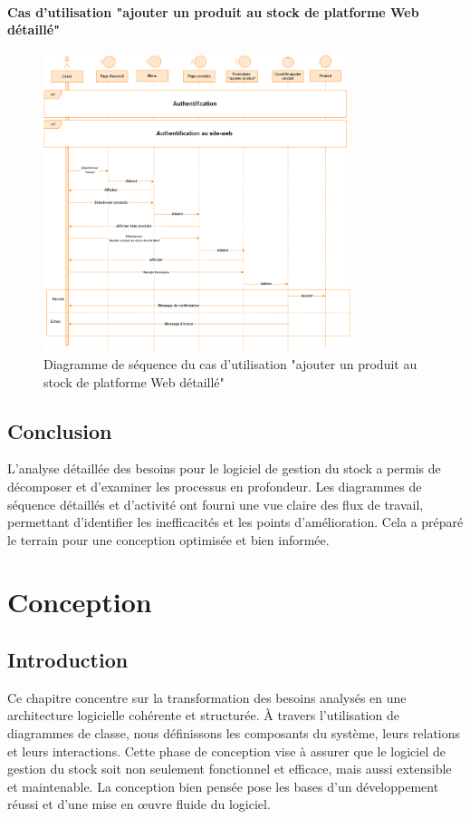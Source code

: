 \documentclass[edit,12pt,a4paper,ChapStyle,oneside,doubleinterligne]{report}
\begin{document}
\subsubsection{Cas d'utilisation "ajouter un produit au stock de platforme Web détaillé"}
\begin{figure}[h!]\label{fig:Ajouter un produit au stock de site Web}
\centering
\includegraphics[width=0.8\textwidth]{images/Cas_ Ajouter un produit au stock de site Web.png}
\caption{Diagramme de séquence du cas d'utilisation "ajouter un produit au stock de platforme Web détaillé"}
\end{figure}
\section{Conclusion}
L'analyse détaillée des besoins pour le logiciel de gestion du stock a permis de décomposer et d'examiner les processus en profondeur. Les diagrammes de séquence détaillés et d'activité ont fourni une vue claire des flux de travail, permettant d'identifier les inefficacités et les points d'amélioration. Cela a préparé le terrain pour une conception optimisée et bien informée.
\chapter{Conception}
\section{Introduction}
Ce chapitre concentre sur la transformation des besoins analysés en une architecture logicielle cohérente et structurée. À travers l'utilisation de diagrammes de classe, nous définissons les composants du système, leurs relations et leurs interactions. Cette phase de conception vise à assurer que le logiciel de gestion du stock soit non seulement fonctionnel et efficace, mais aussi extensible et maintenable. La conception bien pensée pose les bases d'un développement réussi et d'une mise en œuvre fluide du logiciel.
\end{document}
